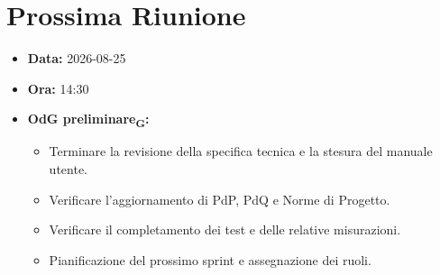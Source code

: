 
\section{Prossima Riunione}

\begin{itemize}

\item \textbf{Data:} 2026-08-25

\item \textbf{Ora:} 14:30

\item \textbf{OdG preliminare\textsubscript{G}:}

\begin{itemize}

\item Terminare la revisione della specifica tecnica e la stesura del manuale utente.

\item Verificare l'aggiornamento di PdP, PdQ e Norme di Progetto.

\item Verificare il completamento dei test e delle relative misurazioni.

\item Pianificazione del prossimo sprint e assegnazione dei ruoli.

\end{itemize}

\end{itemize}
